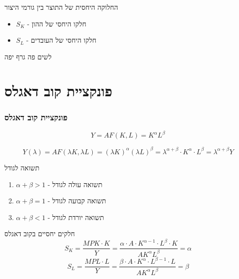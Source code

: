 \documentclass[usenames,dvipsnames]{beamer}
\renewcommand{\a}{\alpha}
\begin{document}
\begin{RTL}
\begin{frame}[allowframebreaks]
\begin{block}{החלוקה היחסית של התוצר בין גורמי היצור}
            \begin{itemize}
                \item $S_K$ - חלקו היחסי של ההון
                \item $S_L$ - חלקו היחסי של העובדים
            \end{itemize}
        \end{block}


        \framebreak
        לשים פה גרף יפה
    \end{frame}

    \section{פונקציית קוב דאגלס}
    \begin{frame}[allowframebreaks]
        \frametitle{פונקציית קוב דאגלס}
        \begin{equation*}
            Y = AF(K,L) = K^{\a} L^{\beta}
        \end{equation*}

        \begin{equation*}
            Y(\lambda) = AF(\lambda K, \lambda L) = (\lambda K ) ^ \alpha (\lambda L) ^ \beta = \lambda ^ {\alpha + \beta} \cdot K ^ \alpha \cdot L ^ \beta = \lambda ^{\alpha + \beta} Y
        \end{equation*}
        
        \begin{block}{תשואה לגודל}
            \begin{enumerate}
                \item $\alpha + \beta > 1 $ -  תשואה עולה לגודל
                \item $\alpha + \beta = 1 $ -  תשואה קבועה לגודל
                \item $\alpha + \beta < 1 $ -  תשואה יורדת לגודל
            \end{enumerate}
        \end{block}
    
        \framebreak

        \begin{block}{חלקים יחסיים בקוב דאגלס}
            $$S_K = \frac{MPK \cdot K}{Y} = \frac{\alpha \cdot A \cdot K^{\alpha - 1} \cdot L^\beta \cdot K}{AK^\alpha L^\beta} = \alpha$$
            $$S_L = \frac{MPL \cdot L}{Y} = \frac{\beta \cdot A \cdot K^{\alpha} \cdot L^{\beta - 1 } \cdot L }{AK^\alpha L^\beta} = \beta$$
        \end{block}


\end{frame}
\end{RTL}
\end{document}
